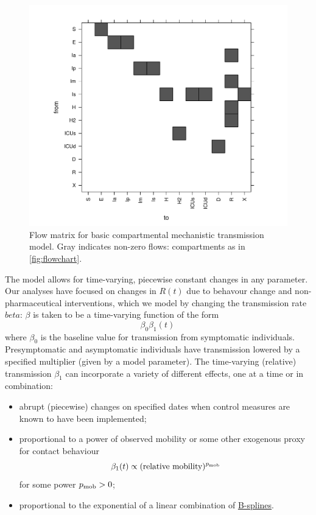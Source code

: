 \documentclass[12pt]{article}\usepackage[]{graphicx}\usepackage[]{color}
\begin{document}
\begin{figure}[ht!]
\color{fgcolor}
\includegraphics[width=\maxwidth]{figure/flowmatrix-1.pdf} 

\caption{Flow matrix for basic compartmental mechanistic transmission
  model.  Gray indicates non-zero flows: compartments as in
  \cref{fig:flowchart}.  
  }
\label{fig:flowmatrix}
\end{figure}

The model allows for time-varying, piecewise constant changes in any
parameter. Our analyses have focused on changes in $R(t)$ due
to behavour change and non-pharmaceutical interventions, which we model
by changing the transmission rate $beta$: $\beta$
is taken to be a time-varying function of the form
\begin{equation}
  \beta_0 \beta_1(t)  \,
\end{equation}
where $\beta_0$ is the baseline value for transmission
from symptomatic individuals. Presymptomatic and asymptomatic individuals have transmission
lowered by a specified multiplier (given by a model parameter).
The time-varying (relative) transmission $\beta_1$ can incorporate a variety of different effects, one at a time or in combination:
\begin{itemize}
\item abrupt (piecewise) changes on specified dates when control
  measures are known to have been implemented;
\item proportional to a power of observed mobility or some other
  exogenous proxy for contact behaviour
\begin{equation}\label{eq:pmob}
  \beta_1(t) \propto (\text{relative mobility})^{p_{\rm mob}}
\end{equation}
for some power $p_{\rm mob}>0$;
\item proportional to the exponential of a linear combination of
  \href{https://en.wikipedia.org/wiki/B-spline}{B-splines}.
\end{itemize}
\end{document}
